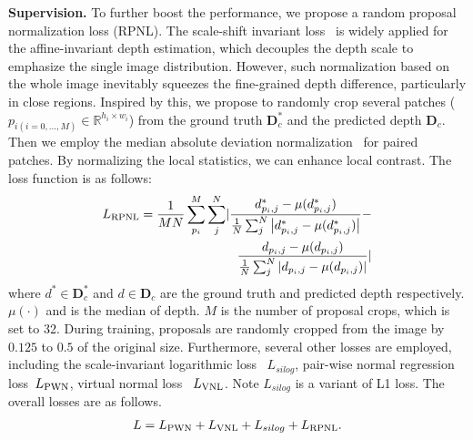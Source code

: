 \noindent\textbf{Supervision.} To further boost the performance, we propose a random proposal normalization loss (RPNL). The scale-shift invariant loss~\cite{Ranftl2020, leres} is widely applied for the affine-invariant depth estimation, which decouples the depth scale to emphasize the single image distribution. However, such normalization based on the whole image inevitably squeezes the fine-grained depth difference, particularly in close regions. Inspired by this, we propose to randomly crop several patches ($p_{i(i=0,...,M)} \in \mathbb{R}^{h_i \times w_i}$) from the ground truth $\mathbf{D}^{*}_c$ and the predicted depth $\mathbf{D}_c$. Then we employ the median absolute deviation normalization~\cite{singh2019investigating} for paired patches. By normalizing the local statistics, we can enhance local contrast. The loss function is as follows:
\begin{eqnarray}\nonumber
    L_{{\rm RPNL}} = \frac{1}{MN} \sum_{p_i}^{M}\sum_{j}^{N} \lvert \frac{d^{*}_{p_i, j} - \mu(d^{*}_{p_i, j})}{\frac{1}{N}\sum_{j}^{N} \left |d^{*}_{p_i, j} - \mu(d^{*}_{p_i, j}) \right |} - \\
    \frac{d_{p_i, j} - \mu(d_{p_i, j})}{\frac{1}{N}\sum_{j}^{N} \left | d_{p_i, j} - \mu(d_{p_i, j}) \right |} \rvert
\label{eq: RPNL}
\end{eqnarray}
where $d^*\in \mathbf{D}^*_c$ and $d \in \mathbf{D}_c$ are the ground truth and predicted depth respectively. $\mu(\cdot)$ and is the median of depth. $M$ is the number of proposal crops, which is set to 32. During training, proposals are randomly cropped from the image by 
$0.125$ to $0.5$ of the original size. Furthermore, several other losses are employed, including the scale-invariant logarithmic loss~\cite{eigen2014depth} $L_{silog}$, pair-wise normal regression loss~\cite{leres}$L_{{\rm PWN}}$, virtual normal loss~\cite{yin2021virtual} $L_{{\rm VNL}}$. Note $L_{silog}$ is a variant of L1 loss.  The overall losses are as follows.
\begin{eqnarray}\nonumber
    L = L_{{\rm PWN}} + L_{{\rm VNL}} + L_{silog} + L_{{\rm RPNL}}.
\label{eq: losses}
\end{eqnarray}
\vspace{-2 em}

